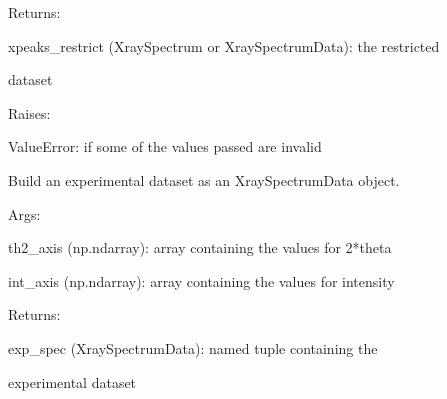 \documentclass[letterpaper,10pt,english]{sphinxmanual}
\begin{document}
\begin{fulllineitems}
\begin{fulllineitems}
\begin{DUlineblock}{0em}
\item[] Returns:
\item[]
\begin{DUlineblock}{\DUlineblockindent}
\item[] xpeaks\_restrict (XraySpectrum or XraySpectrumData): the restricted
\item[]
\begin{DUlineblock}{\DUlineblockindent}
\item[] dataset
\end{DUlineblock}
\end{DUlineblock}
\end{DUlineblock}

\begin{DUlineblock}{0em}
\item[] Raises:
\item[]
\begin{DUlineblock}{\DUlineblockindent}
\item[] ValueError: if some of the values passed are invalid
\end{DUlineblock}
\end{DUlineblock}

\end{fulllineitems}


\begin{fulllineitems}
\label{doctree/soprano.calculate.xrd.xrd:soprano.calculate.xrd.xrd.XRDCalculator.exp_dataset}
Build an experimental dataset as an XraySpectrumData object.

\begin{DUlineblock}{0em}
\item[] Args:
\item[]
\begin{DUlineblock}{\DUlineblockindent}
\item[] th2\_axis (np.ndarray): array containing the values for 2*theta
\item[] int\_axis (np.ndarray): array containing the values for intensity
\end{DUlineblock}
\end{DUlineblock}

\begin{DUlineblock}{0em}
\item[] Returns:
\item[]
\begin{DUlineblock}{\DUlineblockindent}
\item[] exp\_spec (XraySpectrumData): named tuple containing the
\item[]
\begin{DUlineblock}{\DUlineblockindent}
\item[] experimental dataset
\end{DUlineblock}
\end{DUlineblock}
\end{DUlineblock}


\end{fulllineitems}
\end{fulllineitems}
\end{document}
